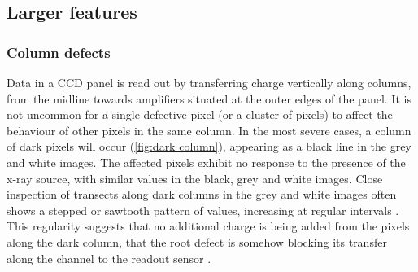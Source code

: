 \documentclass[\main/IO-Pixels.tex]{subfiles}
\begin{document}


\subsection{Larger features}

\subsubsection{Column defects}

\label{sec:column-defects}


Data in a CCD panel is read out by transferring charge vertically along columns,  from the midline towards amplifiers situated at the outer edges of the panel. It is not uncommon for a single defective pixel (or a cluster of pixels) to affect the behaviour of other pixels in the same column. In the most severe cases, a column of dark pixels will occur (\autoref{fig:dark column}), appearing as a black line in the grey and white images. The affected pixels exhibit no response to the presence of the x-ray source, with similar values in the black, grey and white images. Close inspection of transects along dark columns in the grey and white images often shows a stepped or sawtooth pattern of values, increasing at regular intervals  . This regularity suggests that no additional charge is being added from the pixels along the dark column, that the root defect is somehow blocking its transfer along the channel to the readout sensor .
\end{document}
